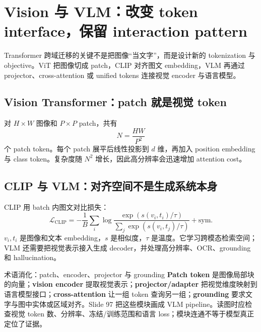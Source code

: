 \section{Vision 与 VLM：改变 token interface，保留 interaction pattern}

Transformer 跨域迁移的关键不是把图像“当文字”，而是设计新的 tokenization 与 objective。ViT 把图像切成 patch，CLIP 对齐图文 embedding，VLM 再通过 projector、cross-attention 或 unified tokens 连接视觉 encoder 与语言模型。

\subsection{Vision Transformer：patch 就是视觉 token}

对 $H\times W$ 图像和 $P\times P$ patch，共有
\[
N=\frac{HW}{P^2}
\]
个 patch token。每个 patch 展平后线性投影到 $d$ 维，再加入 position embedding 与 class token。复杂度随 $N^2$ 增长，因此高分辨率会迅速增加 attention cost。






\subsection{CLIP 与 VLM：对齐空间不是生成系统本身}

CLIP 用 batch 内图文对比损失：
\[
\mathcal{L}_{\text{CLIP}}=-\frac{1}{B}\sum_i
\log\frac{\exp(s(v_i,t_i)/\tau)}{\sum_j\exp(s(v_i,t_j)/\tau)}+\text{sym.}
\]
$v_i,t_i$ 是图像和文本 embedding，$s$ 是相似度，$\tau$ 是温度。它学习跨模态检索空间；VLM 还需要把视觉表示接入生成 decoder，并处理高分辨率、OCR、grounding 和 hallucination。





\begin{knowledgebox}{术语消化：patch、encoder、projector 与 grounding}
\textbf{Patch token} 是图像局部块的向量；\textbf{vision encoder} 提取视觉表示；\textbf{projector/adapter} 把视觉维度映射到语言模型接口；\textbf{cross-attention} 让一组 token 查询另一组；\textbf{grounding} 要求文字与图中实体或区域对齐。Slide 97 把这些模块画成 VLM pipeline。读图时应检查视觉 token 数、分辨率、冻结/训练范围和语言 loss；模块连通不等于模型真正定位了证据。
\end{knowledgebox}

